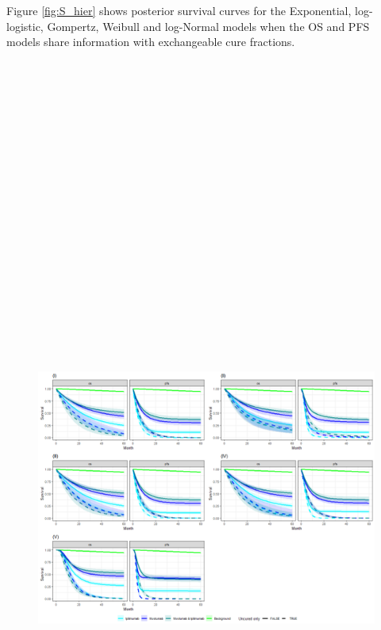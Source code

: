 \documentclass[
]{article}
\begin{document}
Figure \ref{fig:S_hier} shows posterior survival curves for the
Exponential, log-logistic, Gompertz, Weibull and log-Normal models when
the OS and PFS models share information with exchangeable cure
fractions.

\begin{figure}

{\centering \includegraphics[width=15cm,height=40cm]{../plots/plot_S_samepair_grid_cf_hier_diffuncured} 

}
\end{figure}
\end{document}
